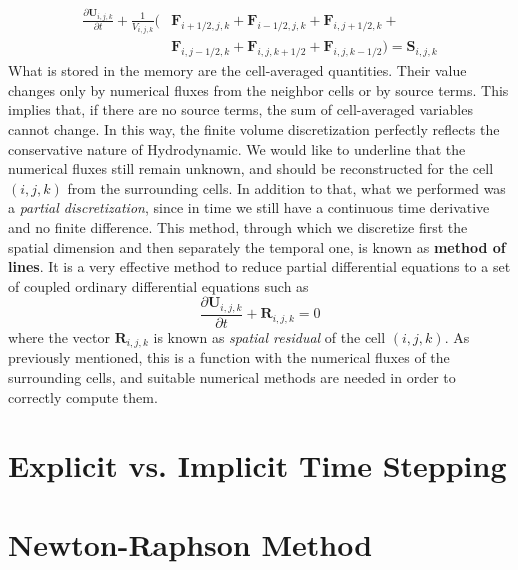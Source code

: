\begin{equation}
\begin{split}
	\frac{\partial \mathbf{U}_{i, j, k}}{\partial t} + \frac{1}{V_{i, j, k}} ( & \mathbf{F}_{i + 1/2, j, k} + \mathbf{F}_{i - 1/2, j, k} +\mathbf{F}_{i , j + 1/2, k} + \\
	& \mathbf{F}_{i , j - 1/2, k} +  \mathbf{F}_{i , j, k + 1/2} + \mathbf{F}_{i , j, k - 1/2}) = \mathbf{S}_{i, j, k}
\end{split}
\end{equation}
What is stored in the memory are the cell-averaged quantities. Their value changes only by numerical fluxes from the neighbor cells or by source terms. This implies that, if there are no source terms, the sum of cell-averaged variables cannot change. In this way, the finite volume discretization perfectly reflects the conservative nature of Hydrodynamic. We would like to underline that the numerical fluxes still remain unknown, and should be reconstructed for the cell $(i, j, k)$ from the surrounding cells. In addition to that, what we performed was a \textit{partial discretization}, since in time we still have a continuous time derivative and no finite difference. This method, through which we discretize first the spatial dimension and then separately the temporal one, is known as \textbf{method of lines}. It is a very effective method to reduce partial differential equations to a set of coupled ordinary differential equations such as
\begin{equation}
	\frac{\partial \mathbf{U}_{i, j, k}}{\partial t} + \mathbf{R}_{i, j, k}=0
\end{equation}
where the vector $\mathbf{R}_{i, j, k}$ is known as \textit{spatial residual} of the cell $(i, j, k)$. As previously mentioned, this is a function with the numerical fluxes of the surrounding cells, and suitable numerical methods are needed in order to correctly compute them. 
\section{Explicit vs. Implicit Time Stepping}
\section{Newton-Raphson Method}

